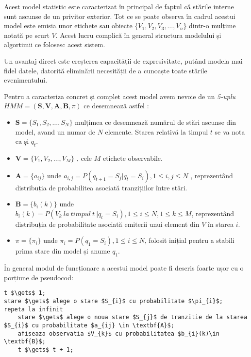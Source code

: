 Acest model statistic este caracterizat în principal de faptul că stările interne sunt ascunse de un privitor exterior. Tot ce se poate observa în cadrul acestui model este emisia unor etichete sau obiecte 
$\{V_{1},V_{2},V_{3},\dots,V_{n}\}$ dintr-o mulțime notată pe scurt $V$. Acest lucru complică în general structura modelului și algortimii ce folosesc acest sistem. \par

Un avantaj direct este creșterea capacității de expresivitate, putând modela mai fidel datele, datorită eliminării necesității de a cunoaște toate stările evenimentului.\par

Pentru a caracteriza concret și complet acest model avem nevoie de un \textit{5-uplu} $ HMM = (\textbf{S},\textbf{V},\textbf{A},\textbf{B},\pi)$ ce desemnează astfel : \par
\begin{itemize}
\item{$\textbf{S} = \{S_{1},S_{2},\dots,S_{N}\}$ mulțimea ce desemnează numărul de stări ascunse din model, avand un numar de $N$ elemente. Starea relativă la timpul $t$ se va nota ca și $q_{t}$.}
\item{$\textbf{V} = \{V_{1},V_{2},\dots,V_{M}\}$ , cele $M$ etichete observabile.}
\item{$\textbf{A} = \{a_{ij}\}$ unde $a_{i,j} = P(q_{t+1} = S_{j} | q_{t} = S_{i}) , 1 \leq i , j \leq N$ , reprezentând distribuția de probabilitea asociată tranzițiilor între stări.}
\item{$\textbf{B} = \{b_{i}(k)\}$ unde $b_{i}(k) = P(V_{k}\ la\ timpul\ t\ | q_{t} = S_{i}), 1 \leq i \leq N , 1 \leq k \leq M$, reprezentând distribuția de probabilitate asociată emiterii unui element din $V$ în starea $i$.}
\item{$\pi = \{\pi_{i}\}$ unde $\pi_{i} = P(q_{1} = S_{i}) , 1 \leq i \leq N$, folosit inițial pentru a stabili prima stare din model și anume $q_{1}$.}
\end{itemize}
\par

În general modul de funcționare a acestui model poate fi descris foarte ușor cu o porțiune de pseudocod:

\begin{lstlisting}[mathescape=true , caption=Pseudocod ce descrie modul de operare a unui $HMM$]
t $\gets$ 1;
stare $\gets$ alege o stare $S_{i}$ cu probabilitate $\pi_{i}$;
repeta la infinit
	stare $\gets$ alege o noua stare $S_{j}$ de tranzitie de la starea $S_{i}$ cu probabilitate $a_{ij} \in \textbf{A}$;
	afiseaza observatia $V_{k}$ cu probabilitatea $b_{i}(k)\in \textbf{B}$;
	t $\gets$ t + 1;
\end{lstlisting}

